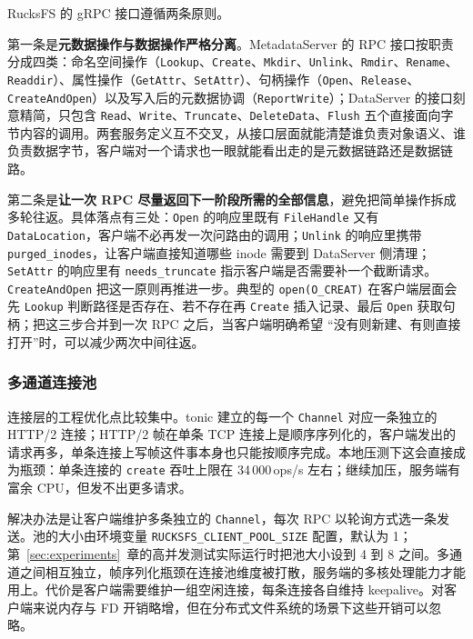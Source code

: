 RucksFS 的 gRPC 接口遵循两条原则。

第一条是\textbf{元数据操作与数据操作严格分离}。MetadataServer 的 RPC 接口按职责分成四类：命名空间操作（\texttt{Lookup}、\texttt{Create}、\texttt{Mkdir}、\texttt{Unlink}、\texttt{Rmdir}、\texttt{Rename}、\texttt{Readdir}）、属性操作（\texttt{GetAttr}、\texttt{SetAttr}）、句柄操作（\texttt{Open}、\texttt{Release}、\texttt{CreateAndOpen}）以及写入后的元数据协调（\texttt{ReportWrite}）；DataServer 的接口刻意精简，只包含 \texttt{Read}、\texttt{Write}、\texttt{Truncate}、\texttt{DeleteData}、\texttt{Flush} 五个直接面向字节内容的调用。两套服务定义互不交叉，从接口层面就能清楚谁负责对象语义、谁负责数据字节，客户端对一个请求也一眼就能看出走的是元数据链路还是数据链路。

第二条是\textbf{让一次 RPC 尽量返回下一阶段所需的全部信息}，避免把简单操作拆成多轮往返。具体落点有三处：\texttt{Open} 的响应里既有 \texttt{FileHandle} 又有 \texttt{DataLocation}，客户端不必再发一次问路由的调用；\texttt{Unlink} 的响应里携带 \texttt{purged\_inodes}，让客户端直接知道哪些 inode 需要到 DataServer 侧清理；\texttt{SetAttr} 的响应里有 \texttt{needs\_truncate} 指示客户端是否需要补一个截断请求。\texttt{CreateAndOpen} 把这一原则再推进一步。典型的 \texttt{open(O\_CREAT)} 在客户端层面会先 \texttt{Lookup} 判断路径是否存在、若不存在再 \texttt{Create} 插入记录、最后 \texttt{Open} 获取句柄；把这三步合并到一次 RPC 之后，当客户端明确希望 “没有则新建、有则直接打开”时，可以减少两次中间往返。

\subsubsection{多通道连接池}

连接层的工程优化点比较集中。tonic 建立的每一个 \texttt{Channel} 对应一条独立的 HTTP/2 连接；HTTP/2 帧在单条 TCP 连接上是顺序序列化的，客户端发出的请求再多，单条连接上写帧这件事本身也只能按顺序完成。本地压测下这会直接成为瓶颈：单条连接的 \texttt{create} 吞吐上限在 34\,000\,ops/s 左右；继续加压，服务端有富余 CPU，但发不出更多请求。

解决办法是让客户端维护多条独立的 \texttt{Channel}，每次 RPC 以轮询方式选一条发送。池的大小由环境变量 \texttt{RUCKSFS\_CLIENT\_POOL\_SIZE} 配置，默认为 1；第~\ref{sec:experiments}~章的高并发测试实际运行时把池大小设到 4 到 8 之间。多通道之间相互独立，帧序列化瓶颈在连接池维度被打散，服务端的多核处理能力才能用上。代价是客户端需要维护一组空闲连接，每条连接各自维持 keepalive。对客户端来说内存与 FD 开销略增，但在分布式文件系统的场景下这些开销可以忽略。

